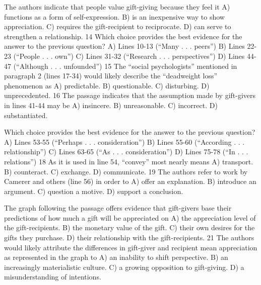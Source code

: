 The authors indicate that people value gift-giving
because they feel it
A) functions as a form of self-expression.
B) is an inexpensive way to show appreciation.
C) requires the gift-recipient to reciprocate.
D) can serve to strengthen a relationship.
14
Which choice provides the best evidence for the
answer to the previous question?
A) Lines 10-13 (“Many . . . peers”)
B) Lines 22-23 (“People . . . own”)
C) Lines 31-32 (“Research . . . perspectives”)
D) Lines 44-47 (“Although . . . unfounded”)
15
The “social psychologists” mentioned in paragraph 2
(lines 17-34) would likely describe the “deadweight
loss” phenomenon as
A) predictable.
B) questionable.
C) disturbing.
D) unprecedented.
16
The passage indicates that the assumption made by
gift-givers in lines 41-44 may be
A) insincere.
B) unreasonable.
C) incorrect.
D) substantiated.



Which choice provides the best evidence for the
answer to the previous question?
A) Lines 53-55 (“Perhaps . . . consideration”)
B) Lines 55-60 (“According . . . relationship”)
C) Lines 63-65 (“As . . . consideration”)
D) Lines 75-78 (“In . . . relations”)
18
As it is used in line 54, “convey” most nearly means
A) transport.
B) counteract.
C) exchange.
D) communicate.
19
The authors refer to work by Camerer and others
(line 56) in order to
A) offer an explanation.
B) introduce an argument.
C) question a motive.
D) support a conclusion.


The graph following the passage offers evidence that
gift-givers base their predictions of how much a gift
will be appreciated on
A) the appreciation level of the gift-recipients.
B) the monetary value of the gift.
C) their own desires for the gifts they purchase.
D) their relationship with the gift-recipients.
21
The authors would likely attribute the differences in
gift-giver and recipient mean appreciation as
represented in the graph to
A) an inability to shift perspective.
B) an increasingly materialistic culture.
C) a growing opposition to gift-giving.
D) a misunderstanding of intentions.




\endinput


